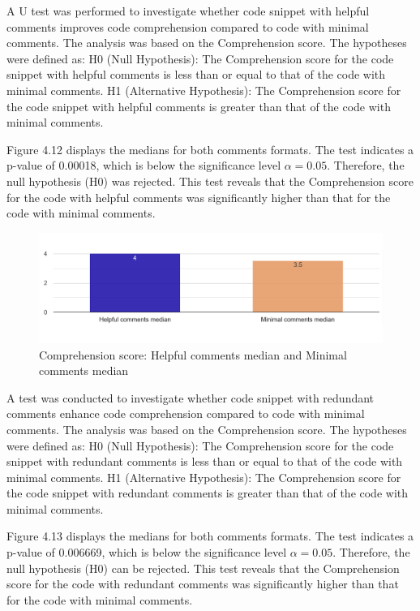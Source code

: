 A U test was performed to investigate whether code snippet with helpful comments improves code comprehension compared to code with minimal comments. The analysis was based on the Comprehension score. The hypotheses were defined as: H0 (Null Hypothesis): The Comprehension score for the code snippet with helpful comments is less than or equal to that of the code with minimal comments.  H1 (Alternative Hypothesis): The Comprehension score for the code snippet with helpful comments is greater than that of the code with minimal comments.

Figure 4.12 displays the medians for both comments formats.
The test indicates a p-value of 0.00018, which is below the significance level $\alpha = 0.05$. Therefore, the null hypothesis (H0) was rejected.  This test reveals that the Comprehension score for the code with helpful comments was significantly higher than that for the code with minimal comments. 

\begin{figure} [H]
  \centering
  \includegraphics[scale=0.4]{figures/h-m-q3.png}
  \caption{Comprehension score:  Helpful comments median and Minimal comments median}
  \label{fig:AnhangsChor}
\end{figure}


A test was conducted to investigate whether code snippet with redundant comments enhance code comprehension compared to code with minimal comments. The analysis was based on the Comprehension score. The hypotheses were defined as: H0 (Null Hypothesis): The Comprehension score for the code snippet with redundant comments is less than or equal to that of the code with minimal comments.  H1 (Alternative Hypothesis): The Comprehension score for the code snippet with redundant comments is greater than that of the code with minimal comments. 


Figure 4.13 displays the medians for both comments formats.
The test indicates a p-value of 0.006669, which is below the significance level $\alpha = 0.05$. Therefore, the null hypothesis (H0) can be rejected.  This test reveals that the Comprehension score for the code with redundant comments was significantly higher than that for the code with minimal comments. 

